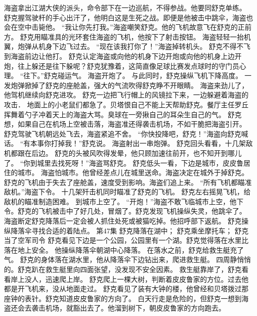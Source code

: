 \documentclass[a4paper,12pt,UTF8,twoside]{ctexbook}
\begin{document}
        海盗拿出江湖大侠的派头，命令部下在一边巡航，不得参战。他要同舒克单练。 
        舒克握驾驶杆的手心出汗了，他明白这是生死之战。即便是他被击中跳伞，海盗也会在空中击毙他。 
        “我让你先打我。”海盗嘲笑舒克。他的飞机故意飞在舒克的正前方。 
        舒克用瞄准具的光环套住海盗的飞机，他按下了射击按钮。 
        海盗轻轻一抬机翼，炮弹从机身下边飞过去。 
        “现在该我打你了！”海盗掉转机头。 
        舒克不得不飞到海盗前边让他打。 
        舒克认定海盗或向他的机身下边开炮或向他的机身上边开炮，往上躲还是往下躲呢？舒克犹豫着，这简直像足球比赛发点球时的守门员心理。 
        “往下。”舒克碰运气。 
        海盗开炮了。 
        与此同时，舒克操纵飞机下降高度。 
        一发炮弹掀掉了舒克的座舱盖，强大的气流吹得舒克睁不开眼睛。 
        海盗来劲儿了，他驾机继续向舒克进攻。 
        舒克一边把飞行帽上的风镜拉下来，一边躲避着海盗的攻击． 
        地面上的小老鼠们都急了。贝塔恨自己不能上天帮助舒克。餐厅主任罗丘挥舞着勺子冲着天上的海盗大骂。臭球在一旁揪自己的耳朵生自己的气。 
        舒克想，如果自己在机场上空被击落，海盗准还得袭击机场，不如干脆把海盗引开。 
        舒克驾驶飞机朝远处飞去，海盗紧追不舍。 
        “你快投降吧，舒克！”海盗向舒克喊话。 
        “有本事你打掉我！”舒克说。 
        海盗射出一串炮弹。 
        舒克回头看看，十几架敌机都跟在后边。 
        舒克的头被风吹得发晕，他只顾加速往前开，也不知开到哪儿了。 
        “你到城里去找死呀！”海盗骂舒克。 
        舒克低头一看，下边是城市，皮皮鲁居住的城市。 
        海盗怕城市。他曾经差点儿在城里送命。海盗决定在城外于掉舒克。 
        舒克的飞机由于失去了座舱盖，速度受到影响。海盗们追上来。 
        “所有飞机都瞄准敌机。”海盗下令。 
        十几架歼击机同时瞄准了舒克的飞机。 
        舒克左右摇晃飞机，给敌机的瞄准制造困难。 
        到城市上空了。 
        “开炮！”海盗不敢飞临城市上空，他下令。舒克的飞机被击中了好几处，冒烟了。舒克发现飞机操纵失灵，他跳伞了。 
        海盗断定舒克降落后一定会被人抓住处死或被猫吃掉。他招呼部下返航。 
        舒克操纵降落伞寻找合适的着陆点。   第47集 
        舒克降落在湖中； 
        舒克乘坐摩托车； 
        舒克当了空军司令   
        舒克看见下边是一个公园，公园里有一个湖。舒克觉得落在水里比落在地上安全。 
        他操纵降落伞朝湖中心降落。 
        在落水之前，舒克给救生艇充了气。 
        舒克的身体落在湖水里，他从降落伞下边钻出来，爬进救生艇。 
        四周静悄悄的。舒克趴在救生艇里向四面张望，没发现不安全因素。 
        救生艇靠岸了，舒克看看岸上没人，迅速爬上岸。 
        舒克爬上一棵大树，判断着皮皮鲁家的方位。过去他都是开飞机来，没从地面走过。 
        舒克看见了装有大钟的楼，他曾经和贝塔拨过那座钟的表针。舒克知道皮皮鲁家的方向了。 
        白天行走是危险的，但舒克一想到海盗还会去袭击机场，就豁出去了。他溜到树下，朝皮皮鲁家的方向跑去。 
\end{document}
